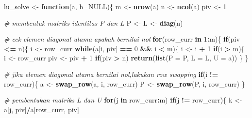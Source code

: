 \documentclass[]{book}
\newenvironment{Shaded}{\begin{snugshade}}{\end{snugshade}}
\newcommand{\CommentTok}[1]{\textcolor[rgb]{0.56,0.35,0.01}{\textit{#1}}}
\newcommand{\ControlFlowTok}[1]{\textcolor[rgb]{0.13,0.29,0.53}{\textbf{#1}}}
\newcommand{\DataTypeTok}[1]{\textcolor[rgb]{0.13,0.29,0.53}{#1}}
\newcommand{\DecValTok}[1]{\textcolor[rgb]{0.00,0.00,0.81}{#1}}
\newcommand{\KeywordTok}[1]{\textcolor[rgb]{0.13,0.29,0.53}{\textbf{#1}}}
\newcommand{\NormalTok}[1]{#1}
\newcommand{\OperatorTok}[1]{\textcolor[rgb]{0.81,0.36,0.00}{\textbf{#1}}}
\newcommand{\OtherTok}[1]{\textcolor[rgb]{0.56,0.35,0.01}{#1}}
\newcommand{\StringTok}[1]{\textcolor[rgb]{0.31,0.60,0.02}{#1}}
\theoremstyle{definition}
\theoremstyle{definition}
\theoremstyle{definition}
\theoremstyle{remark}
\begin{document}
\begin{Shaded}
\begin{Highlighting}[]
\NormalTok{lu_solve <-}\StringTok{ }\ControlFlowTok{function}\NormalTok{(a, }\DataTypeTok{b=}\OtherTok{NULL}\NormalTok{)\{}
\NormalTok{    m <-}\StringTok{ }\KeywordTok{nrow}\NormalTok{(a)}
\NormalTok{    n <-}\StringTok{ }\KeywordTok{ncol}\NormalTok{(a)}
\NormalTok{    piv <-}\StringTok{ }\DecValTok{1}

\CommentTok{# membentuk matriks identitas P dan L}
\NormalTok{    P <-}\StringTok{ }\NormalTok{L <-}\StringTok{ }\KeywordTok{diag}\NormalTok{(n)}

\CommentTok{# cek elemen diagonal utama apakah bernilai nol}
    \ControlFlowTok{for}\NormalTok{(row_curr }\ControlFlowTok{in} \DecValTok{1}\OperatorTok{:}\NormalTok{m)\{}
        \ControlFlowTok{if}\NormalTok{(piv }\OperatorTok{<=}\StringTok{ }\NormalTok{n)\{}
\NormalTok{            i <-}\StringTok{ }\NormalTok{row_curr}
            \ControlFlowTok{while}\NormalTok{(a[i, piv] }\OperatorTok{==}\StringTok{ }\DecValTok{0} \OperatorTok{&&}\StringTok{ }\NormalTok{i }\OperatorTok{<}\StringTok{ }\NormalTok{m)\{}
\NormalTok{                i <-}\StringTok{ }\NormalTok{i }\OperatorTok{+}\StringTok{ }\DecValTok{1}
                \ControlFlowTok{if}\NormalTok{(i }\OperatorTok{>}\StringTok{ }\NormalTok{m)\{}
\NormalTok{                    i <-}\StringTok{ }\NormalTok{row_curr}
\NormalTok{                    piv <-}\StringTok{ }\NormalTok{piv }\OperatorTok{+}\StringTok{ }\DecValTok{1}
                    \ControlFlowTok{if}\NormalTok{(piv }\OperatorTok{>}\StringTok{ }\NormalTok{n)}
                        \KeywordTok{return}\NormalTok{(}\KeywordTok{list}\NormalTok{(}\DataTypeTok{P =}\NormalTok{ P, }\DataTypeTok{L =}\NormalTok{ L, }\DataTypeTok{U =}\NormalTok{ a))}
\NormalTok{                \}}
\NormalTok{            \}}
            
\CommentTok{# jika elemen diagonal utama bernilai nol,lakukan row swapping}
            \ControlFlowTok{if}\NormalTok{(i }\OperatorTok{!=}\StringTok{ }\NormalTok{row_curr)\{}
\NormalTok{                a <-}\StringTok{ }\KeywordTok{swap_row}\NormalTok{(a, i, row_curr)}
\NormalTok{                P <-}\StringTok{ }\KeywordTok{swap_row}\NormalTok{(P, i, row_curr)}
\NormalTok{            \}}
            
  \CommentTok{# pembentukan matriks L dan U}
            \ControlFlowTok{for}\NormalTok{(j }\ControlFlowTok{in}\NormalTok{ row_curr}\OperatorTok{:}\NormalTok{m)}
                \ControlFlowTok{if}\NormalTok{(j }\OperatorTok{!=}\StringTok{ }\NormalTok{row_curr)\{}
\NormalTok{                    k <-}\StringTok{ }\NormalTok{a[j, piv]}\OperatorTok{/}\NormalTok{a[row_curr, piv]}
                    

\end{Highlighting}
\end{Shaded}
\end{document}
